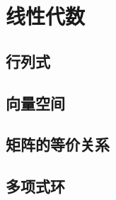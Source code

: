 \part{线性代数}
\begingroup
\def\x{\mat{X}}
\def\y{\mat{Y}}
\def\a{\mat{\alpha}}
\def\b{\mat{\beta}}
\def\e{\mat{\varepsilon}}
\def\g{\mat{\gamma}}
\def\X#1{\x_{#1}}
\def\A{\mat{A}}
\def\B{\mat{B}}
\def\C{\mat{C}}
\def\D{\mat{D}}
\def\P{\mat{P}}
\def\Q{\mat{Q}}
\def\l{\lambda}
\def\L#1{\l_{#1}}
\def\z{\mat{0}}
\def\E{\mat{E}}
\def\V{\mat{\Lambda}}









\chapter{行列式}








\chapter{向量空间}









\chapter{矩阵的等价关系}





\chapter{多项式环}

\endgroup

